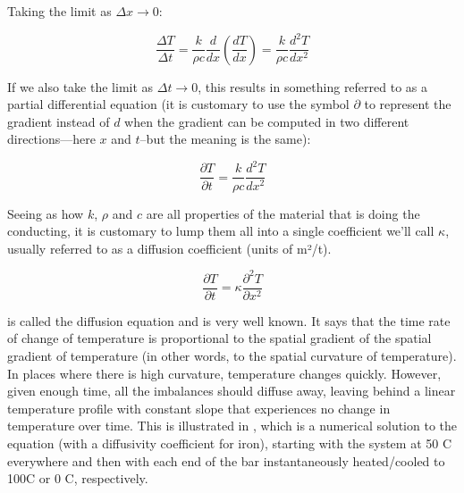 Taking the limit as $\Delta x \rightarrow 0 $:

\begin{equation} \label{eq:secondderivative} 
\frac{\Delta T}{\Delta t}=\frac{k}{\rho c}\frac{d}{dx}\left ( \frac{dT}{dx} \right )=\frac{k}{\rho c}\frac{d^{2}T}{dx^2}
\end{equation}

If we also take the limit as $\Delta t \rightarrow 0$, this results in something referred to as a partial differential equation (it is customary to use the symbol $\partial$ to represent the gradient instead of $d$ when the gradient can be computed in two different directions—here $x$ and $t$--but the meaning is the same):

\begin{equation} \label{eq:diffusion1} 
\frac{\partial T}{\partial t}=\frac{k}{\rho c}\frac{d^{2}T}{dx^2} 
\end{equation}

Seeing as how $k$, $\rho$ and $c$ are all properties of the material that is doing the conducting, it is customary to lump them all into a single coefficient we’ll call $\kappa$, usually referred to as a diffusion coefficient (units of m²/t).  

\begin{equation} \label{eq:diffusion} 
\frac{\partial T}{\partial t}=\kappa \frac{\partial ^{2}T}{\partial x^2} 
\end{equation}

 is called the diffusion equation and is very well known.  It says that the time rate of change of temperature is proportional to the spatial gradient of the spatial gradient of temperature (in other words, to the spatial curvature of temperature).  In places where there is high curvature, temperature changes quickly.  However, given enough time, all the imbalances should diffuse away, leaving behind a linear temperature profile with constant slope that experiences no change in temperature over time.  This is illustrated in , which is a numerical solution to the equation (with a diffusivity coefficient for iron), starting with the system at 50 \textdegree C everywhere and then with each end of the bar instantaneously heated/cooled to 100\textdegree C or 0 \textdegree C, respectively.  

